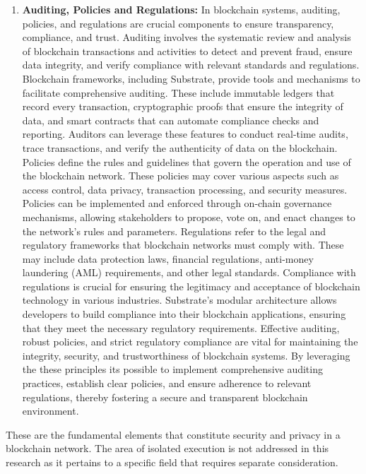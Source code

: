 \begin{enumerate}[label=(\arabic*)]
	\item\textbf{Auditing, Policies and Regulations:}\cite{hype_security}\cite{nist_pub_bloc_acc_ctrl}
    In blockchain systems, auditing, policies, and regulations are crucial components to ensure transparency, compliance, and trust. Auditing involves the systematic review and analysis of blockchain transactions and activities to detect and prevent fraud, ensure data integrity, and verify compliance with relevant standards and regulations.
	Blockchain frameworks, including Substrate, provide tools and mechanisms to facilitate comprehensive auditing. These include immutable ledgers that record every transaction, cryptographic proofs that ensure the integrity of data, and smart contracts that can automate compliance checks and reporting. Auditors can leverage these features to conduct real-time audits, trace transactions, and verify the authenticity of data on the blockchain.
	Policies define the rules and guidelines that govern the operation and use of the blockchain network. These policies may cover various aspects such as access control, data privacy, transaction processing, and security measures. Policies can be implemented and enforced through on-chain governance mechanisms, allowing stakeholders to propose, vote on, and enact changes to the network's rules and parameters.
	Regulations refer to the legal and regulatory frameworks that blockchain networks must comply with. These may include data protection laws, financial regulations, anti-money laundering (AML) requirements, and other legal standards. Compliance with regulations is crucial for ensuring the legitimacy and acceptance of blockchain technology in various industries. Substrate's modular architecture allows developers to build compliance into their blockchain applications, ensuring that they meet the necessary regulatory requirements.
	Effective auditing, robust policies, and strict regulatory compliance are vital for maintaining the integrity, security, and trustworthiness of blockchain systems. By leveraging the these principles its possible to implement comprehensive auditing practices, establish clear policies, and ensure adherence to relevant regulations, thereby fostering a secure and transparent blockchain environment.

\end{enumerate}

These are the fundamental elements that constitute security and privacy in a blockchain network. The area of isolated execution is not addressed in this research as it pertains to a specific field that requires separate consideration. 

